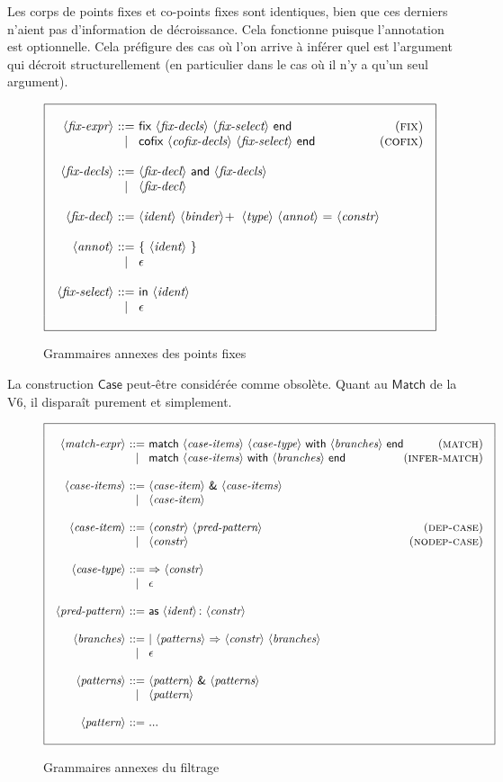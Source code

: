 \documentclass{article}
\makeatletter
\def\NT#1{\langle\textit{#1}\rangle}
\def\TERM#1{\textsf{#1}}
\def\STAR#1{#1\!*}
\def\PLUS#1{#1\!+}
\newenvironment{cadre}
        {\begin{array}{|c|}\hline\\}
        {\\\\\hline\end{array}}
\newenvironment{rulebox}
        {$$\begin{cadre}\begin{array}{r@{~}c@{~}l@{}r}}
        {\end{array}\end{cadre}$$}
\def\DEFNT#1{\NT{#1} & ::= &}
\def\RNAME#1{(\textsc{#1})}
\def\SEPDEF{\\\\}
\def\nlsep{\\&|&}
\makeatother
\begin{document}
Les corps de points fixes et co-points fixes sont identiques, bien que
ces derniers n'aient pas d'information de décroissance. Cela
fonctionne puisque l'annotation est optionnelle. Cela préfigure des
cas où l'on arrive à inférer quel est l'argument qui décroit
structurellement (en particulier dans le cas où il n'y a qu'un seul
argument).

\begin{figure}
\begin{rulebox}
\DEFNT{fix-expr}
       \TERM{fix}~\NT{fix-decls}    ~\NT{fix-select} ~\TERM{end} &\RNAME{fix}
\nlsep \TERM{cofix}~\NT{cofix-decls}~\NT{fix-select} ~\TERM{end} &\RNAME{cofix}
\SEPDEF
\DEFNT{fix-decls}
       \NT{fix-decl}~\TERM{and}~\NT{fix-decls}
\nlsep \NT{fix-decl}
\SEPDEF
\DEFNT{fix-decl}
       \NT{ident}~\PLUS{\NT{binder}}~\NT{type}~\NT{annot}
       ~\TERM{=}~\NT{constr}
\SEPDEF
\DEFNT{annot}
       \TERM{\{}~\NT{ident}~\TERM{\}}
\nlsep \epsilon
\SEPDEF
\DEFNT{fix-select}
       \TERM{in}~\NT{ident}
\nlsep \epsilon
\end{rulebox}
\caption{Grammaires annexes des points fixes}
\label{gram-fix}
\end{figure}

La construction $\TERM{Case}$ peut-être considérée comme
obsolète. Quant au $\TERM{Match}$ de la V6, il disparaît purement et
simplement.

\begin{figure}
\begin{rulebox}
\DEFNT{match-expr}
       \TERM{match}~\NT{case-items}~\NT{case-type}~\TERM{with}~
       \NT{branches}~\TERM{end}        &\RNAME{match}
\nlsep \TERM{match}~\NT{case-items}~\TERM{with}~
       \NT{branches}~\TERM{end}        &\RNAME{infer-match}
\SEPDEF
\DEFNT{case-items}
       \NT{case-item} ~\TERM{\&} ~\NT{case-items}
\nlsep \NT{case-item}
\SEPDEF
\DEFNT{case-item}
       \NT{constr}~\NT{pred-pattern} &\RNAME{dep-case}
\nlsep \NT{constr}                   &\RNAME{nodep-case}
\SEPDEF
\DEFNT{case-type}
       \TERM{$\Rightarrow$}~\NT{constr}
\nlsep \epsilon
\SEPDEF
\DEFNT{pred-pattern}
       \TERM{as}~\NT{ident} ~\TERM{\!:}~\NT{constr}
\SEPDEF
\DEFNT{branches}
       \TERM{|} ~\NT{patterns} ~\TERM{$\Rightarrow$}
        ~\NT{constr} ~\NT{branches}
\nlsep \epsilon
\SEPDEF
\DEFNT{patterns}
       \NT{pattern} ~\TERM{\&} ~\NT{patterns}
\nlsep \NT{pattern}
\SEPDEF
\DEFNT{pattern} ...
\end{rulebox}
\caption{Grammaires annexes du filtrage}
\label{gram-match}
\end{figure}
\end{document}
